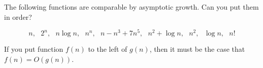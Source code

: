 The following functions are comparable by asymptotic growth.  Can you
put them in order?

$$ n,~~~ 2^n,~~~ n \log  n,~~~ n^n,~~~ n-n^3+7n^5,~~~ n^2+\log  n,~~~
n^2,~~~ \log  n,~~~ n!   $$

If you put function $f(n)$ to the left of $g(n)$, then it must be the case
that $f(n) = O(g(n))$.
